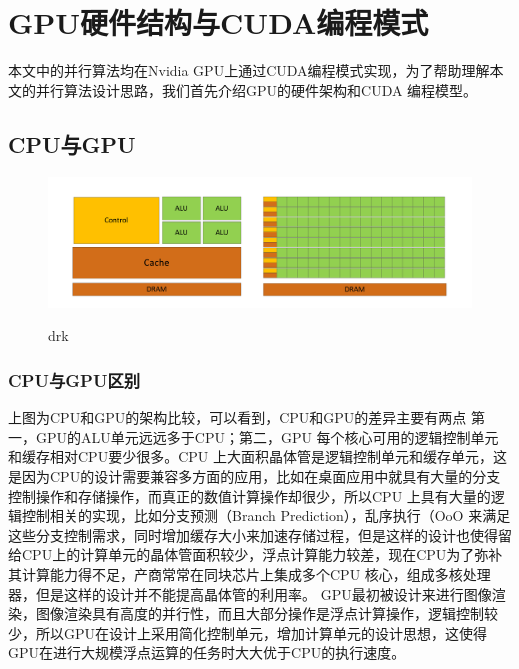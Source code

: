 \section{GPU硬件结构与CUDA编程模式}
本文中的并行算法均在Nvidia GPU上通过CUDA编程模式实现，为了帮助理解本文的并行算法设计思路，我们首先介绍GPU的硬件架构和CUDA 编程模型。
\subsection{CPU与GPU}
\begin{figure}
\setlength{\belowcaptionskip}{-0.5cm}
  \begin{center}
    {\includegraphics[width=1 \textwidth]{figures/GPU&CPU.pdf}}
    \end{center}
  \caption{{\footnotesize{drk}}}
  \label{drk}
\end{figure}
\subsubsection{CPU与GPU区别}
上图为CPU和GPU的架构比较，可以看到，CPU和GPU的差异主要有两点 第一，GPU的ALU单元远远多于CPU；第二，GPU 每个核心可用的逻辑控制单元和缓存相对CPU要少很多。CPU 上大面积晶体管是逻辑控制单元和缓存单元，这是因为CPU的设计需要兼容多方面的应用，比如在桌面应用中就具有大量的分支控制操作和存储操作，而真正的数值计算操作却很少，所以CPU 上具有大量的逻辑控制相关的实现，比如分支预测（Branch Prediction），乱序执行（OoO 来满足这些分支控制需求，同时增加缓存大小来加速存储过程，但是这样的设计也使得留给CPU上的计算单元的晶体管面积较少，浮点计算能力较差，现在CPU为了弥补其计算能力得不足，产商常常在同块芯片上集成多个CPU 核心，组成多核处理器，但是这样的设计并不能提高晶体管的利用率。
GPU最初被设计来进行图像渲染，图像渲染具有高度的并行性，而且大部分操作是浮点计算操作，逻辑控制较少，所以GPU在设计上采用简化控制单元，增加计算单元的设计思想，这使得GPU在进行大规模浮点运算的任务时大大优于CPU的执行速度。
